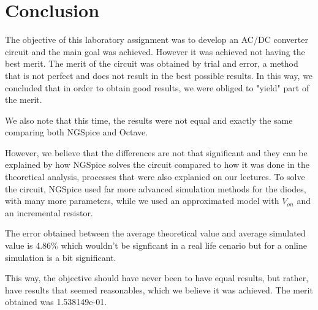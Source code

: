 \newpage
\section{Conclusion}
\label{sec:conclusion}


The objective of this laboratory assignment was to develop an AC/DC converter circuit and the main goal was achieved. However it was achieved not having the best merit. The merit of the circuit was obtained by trial and error, a method that is not perfect and does not result in the best possible results. In this way, we concluded that in order to obtain good results, we were obliged to "yield" part of the merit.

We also note that this time, the results were not equal and exactly the same comparing both NGSpice and Octave.

However, we believe that the differences are not that significant and they can be explained by how NGSpice solves the circuit compared to how it was done in the theoretical analysis, processes that were also explanied on our lectures. To solve the circuit, NGSpice used far more advanced simulation methods for the diodes, with many more parameters, while we used an approximated model with $V_{on}$ and an incremental resistor. 

The error obtained between the average theoretical value and average simulated value is 4.86\% which wouldn't be signficant in a real life cenario but for a online simulation is a bit significant.

This way, the objective should have never been to have equal results, but rather, have results that seemed reasonables, which we believe it was achieved. The merit obtained was 1.538149e-01.

